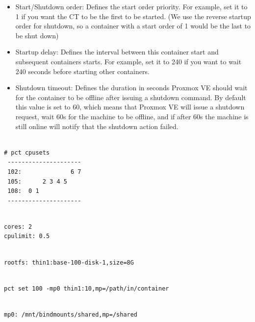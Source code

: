 \begin{itemize}[leftmargin=2cm]

	\item Start/Shutdown order: Defines the start order priority. For example, set it to 1 if you want the CT to be the first to be started. (We use the reverse startup order for shutdown, so a container with a start order of 1 would be the last to be shut down)

	\item Startup delay: Defines the interval between this container start and subsequent containers starts. For example, set it to 240 if you want to wait 240 seconds before starting other containers.

	\item Shutdown timeout: Defines the duration in seconds Proxmox VE should wait for the container to be offline after issuing a shutdown command. By default this value is set to 60, which means that Proxmox VE will issue a shutdown request, wait 60s for the machine to be offline, and if after 60s the machine is still online will notify that the shutdown action failed.

\end{itemize}

\begin{lstlisting}

# pct cpusets
 ---------------------
 102:              6 7
 105:      2 3 4 5
 108:  0 1
 ---------------------

\end{lstlisting}

\begin{lstlisting}

cores: 2
cpulimit: 0.5

\end{lstlisting}

\begin{lstlisting}

rootfs: thin1:base-100-disk-1,size=8G

\end{lstlisting}

\begin{lstlisting}

pct set 100 -mp0 thin1:10,mp=/path/in/container

\end{lstlisting}

\begin{lstlisting}

mp0: /mnt/bindmounts/shared,mp=/shared

\end{lstlisting}

